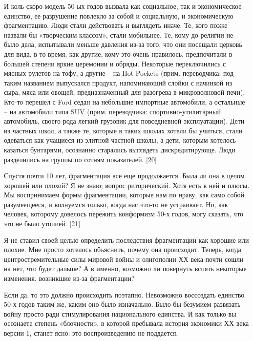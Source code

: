 \documentclass[ebook,12pt,oneside,openany]{memoir}
\begin{document}
И коль скоро модель 50-ых годов вызвала как социальное, так и
экономическое единство, ее разрушение повлекло за собой и социальную,
и экономическую фрагментацию. Люди стали действовать и выглядеть
иначе. Те, кого позже назвали бы «творческим классом», стали
мобильнее. Те, кому до религии не было дела, испытывали меньше
давления из-за того, что они посещали церковь для вида, в то время,
как другие, кому это очень нравилось, предпочитали в большей степени
яркие церемонии и обряды. Некоторые переключились с мясных рулетов на
тофу, а другие – на Hot Pockets (прим. переводчика: под таким
названием выпускался продукт, напоминающий слойки с начинкой из сыра,
мяса или овощей, предназначенный для разогрева в микроволновой печи).
Кто-то перешел с Ford седан на небольшие импортные автомобили, а
остальные – на автомобили типа SUV (прим. переводчика:
спортивно-утилитарный автомобиль, своего рода легкий грузовик для
повседневной эксплуатации). Дети из частных школ, а также те, которые
в таких школах хотели бы учиться, стали одеваться как учащиеся из
элитной частной школы, а дети, которым хотелось казаться бунтарями,
осознанно старались выглядеть дискредитирующе. Люди разделились на
группы по сотням показателей. [20] \newline

Спустя почти 10 лет, фрагментация все еще продолжается. Была ли она в
целом хорошей или плохой? Я не знаю; вопрос риторический. Хотя есть в
ней и плюсы. Мы воспринимаем формы фрагментации, которые нам по нраву,
как само собой разумеещееся, и волнуемся только, когда нас что-то не
устраивает. Но, как человек, которому довелось пережить конформизм
50-х годов, могу сказать, что это не было утопией. [21] \newline

Я не ставил своей целью определить последствия фрагментации как
хорошие или плохие. Мне просто хотелось объяснить, почему она
происходит. Теперь, когда центростремительные силы мировой войны и
олигополии ХХ века почти сошли на нет, что будет дальше? А в именно,
возможно ли повернуть вспять некоторые изменения, возникшие из-за
фрагментации? \newline

Если да, то это должно происходить поэтапно. Невозможно воссоздать
единство 50-х годов таким же, каким оно было изначально. Было бы
безумием развязать войну просто ради стимулирования национального
единства. И как только вы осознаете степень «блочности», в которой
пребывала история экономики ХХ века версии 1, станет ясно: это
воспроизведению не поддается. \newline
\end{document}
